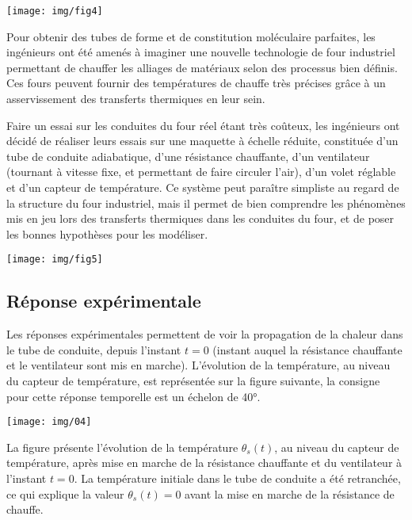 \begin{minipage}{0.4\linewidth}
 \texttt{[image: img/fig4]}
\end{minipage}
\hfill
\begin{minipage}{0.57\linewidth}
Pour obtenir des tubes de forme et de constitution moléculaire parfaites, les ingénieurs ont été amenés à imaginer une nouvelle technologie de four industriel permettant de chauffer les alliages de matériaux selon des processus bien définis. Ces fours peuvent fournir des températures de chauffe très précises grâce à un asservissement des transferts thermiques en leur sein.
\end{minipage}

\vfill

Faire un essai sur les conduites du four réel étant très coûteux, les ingénieurs ont décidé de réaliser leurs essais sur une maquette à échelle réduite, constituée d'un tube de conduite adiabatique, d'une résistance chauffante, d'un ventilateur (tournant à vitesse fixe, et permettant de faire circuler l'air), d'un volet réglable et d'un capteur de température. Ce système peut paraître simpliste au regard de la structure du four industriel, mais il permet de bien comprendre les phénomènes mis en jeu lors des transferts thermiques dans les conduites du four, et de poser les bonnes hypothèses pour les modéliser.

\begin{center}
 \texttt{[image: img/fig5]}
\end{center}

\subsection{Réponse expérimentale}

Les réponses expérimentales permettent de voir la propagation de la chaleur dans le tube de conduite, depuis l'instant $t=0$ (instant auquel la résistance chauffante et le ventilateur sont mis en marche). L'évolution de la température, au niveau du capteur de température, est représentée sur la figure suivante, la consigne pour cette réponse temporelle est un échelon de 40°.

\begin{center}
 \texttt{[image: img/04]}
\end{center}

La figure présente l'évolution de la température $\theta_s(t)$, au niveau du capteur de température, après mise en marche de la résistance chauffante et du ventilateur à l'instant $t=0$. La température initiale dans le tube de conduite a été retranchée, ce qui explique la valeur $\theta_s(t)=0$ avant la mise en marche de la résistance de chauffe.

